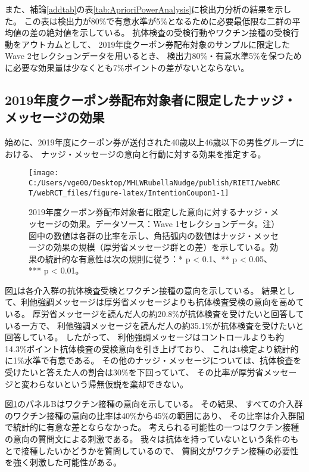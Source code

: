 \documentclass[
  11pt,
  a4paper,
]{article}
\begin{document}
また、補論\ref{addtab}の表\ref{tab:AprioriPowerAnalysis}に検出力分析の結果を示した。
この表は検出力が80\%で有意水準が5\%となるために必要最低限な二群の平均値の差の絶対値を示している。
抗体検査の受検行動やワクチン接種の受検行動をアウトカムとして、
2019年度クーポン券配布対象のサンプルに限定したWave 2セレクションデータを用いるとき、
検出力80\%・有意水準5\%を保つために必要な効果量は少なくとも7\%ポイントの差がないとならない。

\hypertarget{coupon1}{%
\subsection{2019年度クーポン券配布対象者に限定したナッジ・メッセージの効果}\label{coupon1}}

始めに、2019年度にクーポン券が送付された40歳以上46歳以下の男性グループにおける、
ナッジ・メッセージの意向と行動に対する効果を推定する。

\begin{figure}[t]
\texttt{[image: C:/Users/vge00/Desktop/MHLWRubellaNudge/publish/RIETI/webRCT/webRCT\_files/figure-latex/IntentionCoupon1-1]} \caption{2019年度クーポン券配布対象者に限定した意向に対するナッジ・メッセージの効果。データソース：Wave 1セレクションデータ。注）図中の数値は各群の比率を示し、角括弧内の数値はナッジ・メッセージの効果の規模（厚労省メッセージ群との差）を示している。効果の統計的な有意性は次の規則に従う：* p < 0.1、** p < 0.05、*** p < 0.01。}\label{fig:IntentionCoupon1}
\end{figure}

図\ref{fig:IntentionCoupon1}は各介入群の抗体検査受検とワクチン接種の意向を示している。
結果として、利他強調メッセージは厚労省メッセージよりも抗体検査受検の意向を高めている。
厚労省メッセージを読んだ人の約20.8\%が抗体検査を受けたいと回答している一方で、
利他強調メッセージを読んだ人の約35.1\%が抗体検査を受けたいと回答している。
したがって、
利他強調メッセージはコントロールよりも約14.3\%ポイント抗体検査の受検意向を引き上げており、
これはt検定より統計的に1\%水準で有意である。
その他のナッジ・メッセージについては、抗体検査を受けたいと答えた人の割合は30\%を下回っていて、
その比率が厚労省メッセージと変わらないという帰無仮説を棄却できない。

図\ref{fig:IntentionCoupon1}のパネルBはワクチン接種の意向を示している。
その結果、
すべての介入群のワクチン接種の意向の比率は40\%から45\%の範囲にあり、
その比率は介入群間で統計的に有意な差とならなかった。
考えられる可能性の一つはワクチン接種の意向の質問文による刺激である。
我々は抗体を持っていないという条件のもとで接種したいかどうかを質問しているので、
質問文がワクチン接種の必要性を強く刺激した可能性がある。
\end{document}
